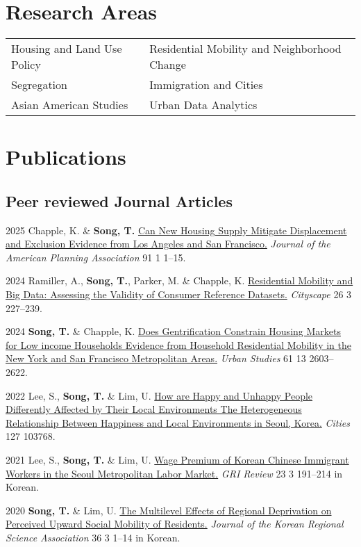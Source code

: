 \documentclass[10pt,letterpaper]{article}
\begin{document}
\section{Research Areas}

\begin{tabular}{@{}p{} p{}@{}}
Housing and Land Use Policy & Residential Mobility and Neighborhood Change\\
Segregation & Immigration and Cities\\
Asian American Studies & Urban Data Analytics
\end{tabular}

\section{Publications}

\subsection{Peer reviewed Journal Articles}
\begin{tablist}
  \item[2025] \tab{}Chapple, K. \& \textbf{Song, T.} \href{https://doi.org/10.1080/01944363.2024.2319293}{Can New Housing Supply Mitigate Displacement and Exclusion Evidence from Los Angeles and San Francisco.} \emph{Journal of the American Planning Association} 91 1 1–15.
  \item[2024] \tab{}Ramiller, A., \textbf{Song, T.}, Parker, M. \& Chapple, K. \href{https://www.jstor.org/stable/48799257}{Residential Mobility and Big Data: Assessing the Validity of Consumer Reference Datasets.} \emph{Cityscape} 26 3 227–239.
  \item[2024] \tab{}\textbf{Song, T.} \& Chapple, K. \href{https://doi.org/10.1177/00420980241244699}{Does Gentrification Constrain Housing Markets for Low income Households Evidence from Household Residential Mobility in the New York and San Francisco Metropolitan Areas.} \emph{Urban Studies} 61 13 2603–2622.
  \item[2022] \tab{}Lee, S., \textbf{Song, T.} \& Lim, U. \href{https://doi.org/10.1016/j.cities.2022.103768}{How are Happy and Unhappy People Differently Affected by Their Local Environments The Heterogeneous Relationship Between Happiness and Local Environments in Seoul, Korea.} \emph{Cities} 127 103768.
  \item[2021] \tab{}Lee, S., \textbf{Song, T.} \& Lim, U. \href{https://www.dbpia.co.kr/Journal/articleDetail?nodeId=NODE11025769}{Wage Premium of Korean Chinese Immigrant Workers in the Seoul Metropolitan Labor Market.} \emph{GRI Review} 23 3 191–214 in Korean.
  \item[2020] \tab{}\textbf{Song, T.} \& Lim, U. \href{https://www.koreascience.or.kr/article/JAKO202030161655441.page}{The Multilevel Effects of Regional Deprivation on Perceived Upward Social Mobility of Residents.} \emph{Journal of the Korean Regional Science Association} 36 3 1–14 in Korean.
\end{tablist}
\end{document}
